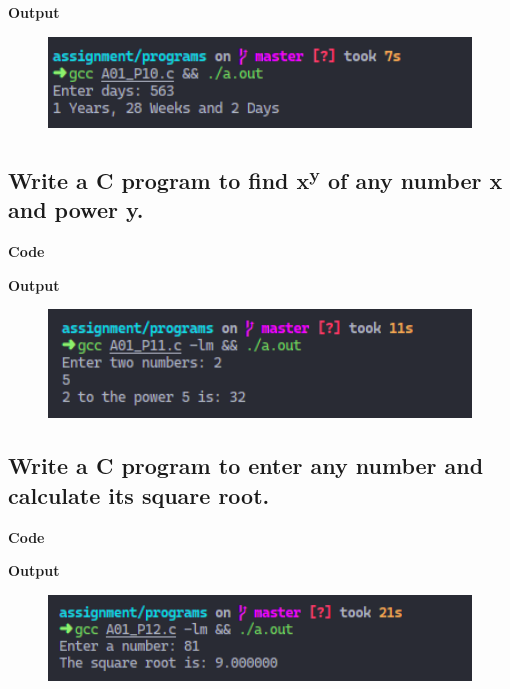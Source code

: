 \documentclass[a4paper]{article}
\begin{document}


\textbf{Output}

\begin{figure}[h]
  \includegraphics[width=12cm]{A01_P10}
\end{figure}

\newpage



\subsection{Write a C program to find x\textsuperscript{y} of any number x and power y.}
\textbf{Code}



\textbf{Output}

\begin{figure}[h]
  \includegraphics[width=12cm]{A01_P11}
\end{figure}

\newpage



\subsection{Write a C program to enter any number and calculate its square root.}
\textbf{Code}



\textbf{Output}

\begin{figure}[h]
  \includegraphics[width=12cm]{A01_P12}
\end{figure}

\newpage

\end{document}

